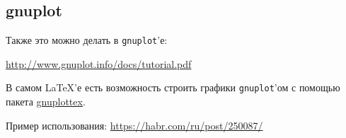 \subsection{gnuplot}

Также это можно делать в \verb*|gnuplot|'е: 

\href{http://www.gnuplot.info/docs/tutorial.pdf}{http://www.gnuplot.info/docs/tutorial.pdf}

В самом \LaTeX'е есть возможность строить графики \verb*|gnuplot|'ом с помощью пакета \href{https://mirror.truenetwork.ru/CTAN/macros/latex/contrib/gnuplottex/gnuplottex.pdf}{gnuplottex}.

 Пример использования:  \href{https://habr.com/ru/post/250087/}{https://habr.com/ru/post/250087/}


